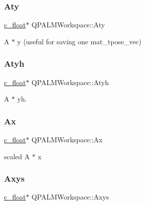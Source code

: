 \subsubsection{\texorpdfstring{Aty}{Aty}}
{\footnotesize\ttfamily \mbox{\hyperlink{global__opts_8h_a7f1a9fda95e52979658c20a0d134fb15}{c\+\_\+float}}$\ast$ Q\+P\+A\+L\+M\+Workspace\+::\+Aty}



A\textquotesingle{} $\ast$ y (useful for saving one mat\+\_\+tpose\+\_\+vec) 

\mbox{\label{structQPALMWorkspace_affa4e2fe7facd4e9c1a4cb14c4103a72}} 
\subsubsection{\texorpdfstring{Atyh}{Atyh}}
{\footnotesize\ttfamily \mbox{\hyperlink{global__opts_8h_a7f1a9fda95e52979658c20a0d134fb15}{c\+\_\+float}}$\ast$ Q\+P\+A\+L\+M\+Workspace\+::\+Atyh}



A\textquotesingle{} $\ast$ yh. 

\mbox{\label{structQPALMWorkspace_a34572f3d0c831ab6978808954c80f48c}} 
\subsubsection{\texorpdfstring{Ax}{Ax}}
{\footnotesize\ttfamily \mbox{\hyperlink{global__opts_8h_a7f1a9fda95e52979658c20a0d134fb15}{c\+\_\+float}}$\ast$ Q\+P\+A\+L\+M\+Workspace\+::\+Ax}



scaled A $\ast$ x 

\mbox{\label{structQPALMWorkspace_a77e294e1afd9d2489e34fd96ef14b15a}} 
\subsubsection{\texorpdfstring{Axys}{Axys}}
{\footnotesize\ttfamily \mbox{\hyperlink{global__opts_8h_a7f1a9fda95e52979658c20a0d134fb15}{c\+\_\+float}}$\ast$ Q\+P\+A\+L\+M\+Workspace\+::\+Axys}



